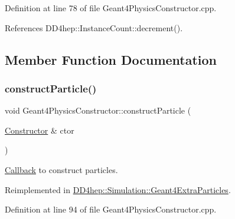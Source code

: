 Definition at line 78 of file Geant4\+Physics\+Constructor.\+cpp.



References D\+D4hep\+::\+Instance\+Count\+::decrement().



\subsection{Member Function Documentation}
\hypertarget{class_d_d4hep_1_1_simulation_1_1_geant4_physics_constructor_a2568ea7c84c0514818e665c409efa304}{}\label{class_d_d4hep_1_1_simulation_1_1_geant4_physics_constructor_a2568ea7c84c0514818e665c409efa304} 
\subsubsection{\texorpdfstring{construct\+Particle()}{constructParticle()}}
{\footnotesize\ttfamily void Geant4\+Physics\+Constructor\+::construct\+Particle (\begin{DoxyParamCaption}\item[{\hyperlink{class_d_d4hep_1_1_simulation_1_1_geant4_physics_constructor_1_1_constructor}{Constructor} \&}]{ctor }\end{DoxyParamCaption})\hspace{0.3cm}{\ttfamily [virtual]}}



\hyperlink{class_d_d4hep_1_1_callback}{Callback} to construct particles. 



Reimplemented in \hyperlink{class_d_d4hep_1_1_simulation_1_1_geant4_extra_particles_ad256c3419ba5c43c223157434f74ae49}{D\+D4hep\+::\+Simulation\+::\+Geant4\+Extra\+Particles}.



Definition at line 94 of file Geant4\+Physics\+Constructor.\+cpp.

\hypertarget{class_d_d4hep_1_1_simulation_1_1_geant4_physics_constructor_a97b80e1316943ae5805d8d006fa4f1b5}{}\label{class_d_d4hep_1_1_simulation_1_1_geant4_physics_constructor_a97b80e1316943ae5805d8d006fa4f1b5} 
